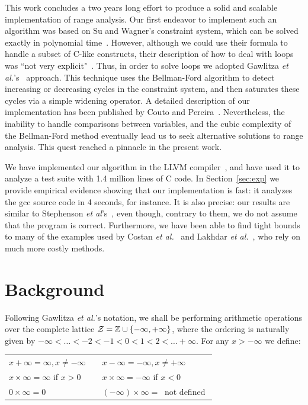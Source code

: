 \documentclass{llncs}
\begin{document}
This work concludes a two years long effort to produce a solid and scalable
implementation of range analysis.
Our first endeavor to implement such an algorithm was based on Su and
Wagner's constraint system, which can be solved exactly in polynomial
time~\cite{Su04,Su05}.
However, although we could use their formula to handle a subset of C-like
constructs, their description of how to deal with loops was
``not very explicit"~\cite[p.422]{Gawlitza09}.
Thus, in order to solve loops we adopted Gawlitza
{\em et al.}'s~\cite{Gawlitza09} approach.
This technique uses the Bellman-Ford algorithm to detect increasing or
decreasing cycles in the constraint system, and then saturates these cycles
via a simple widening operator.
A detailed description of our implementation has been published by
Couto and Pereira~\cite{Couto11}.
Nevertheless, the inability to handle comparisons between variables, and the
cubic complexity of the Bellman-Ford method eventually lead us to seek
alternative solutions to range analysis.
This quest reached a pinnacle in the present work.

We have implemented our algorithm in the LLVM compiler~\cite{Lattner04}, and
have used it to analyze a test suite with 1.4 million lines of C code.
In Section~\ref{sec:exp} we provide empirical evidence showing that our
implementation is fast: it analyzes the gcc source code in 4 seconds, for
instance.
It is also precise: our results are similar to Stephenson
{\em et al}'s~\cite{Stephenson00}, even though, contrary to them, we do not
assume that the program is correct.
Furthermore, we have been able to find tight bounds to many of the examples
used by Costan {\em et al.}~\cite{Costan05} and Lakhdar
{\em et al.}~\cite{Lakhdar11}, who rely on much more costly methods.


\section{Background}
\label{sec:bck}

Following Gawlitza {\em et al.}'s notation, we shall be performing arithmetic
operations over the complete lattice
$\cal{Z} = \mathbb{Z} \cup \{-\infty, +\infty\}$, where the ordering is
naturally given by $-\infty < \ldots < -2 < -1 < 0 < 1 < 2 < \ldots +\infty$.
For any $x > -\infty$ we define:

\begin{tabular}{lcl}
$x + \infty = \infty, x \neq -\infty$ & \mbox{\hspace{0.1cm}} & $x - \infty = - \infty, x \neq +\infty$ \\
$x \times \infty = \infty$ if $x > 0$ & & $x \times \infty = -\infty$ if $x < 0$ \\
$0 \times \infty = 0$ & & $(-\infty) \times \infty = \ $ not defined $$ \\
\end{tabular}
\end{document}
